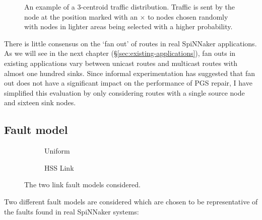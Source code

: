 			\begin{figure}
				\center
				
				\caption[An example of a 3-centroid traffic distribution.]%
				{An example of a 3-centroid traffic distribution. Traffic is
				sent by the node at the position marked with an {\color{red}$\times$}
				to nodes chosen randomly with nodes in lighter areas being selected
				with a higher probability.}
				\label{fig:traffic-distribution-centroids}
			\end{figure}
			
			There is little consensus on the `fan out' of routes in real SpiNNaker
			applications. As we will see in the next chapter
			(\S\ref{sec:existing-applications}), fan outs in existing applications
			vary between unicast routes and multicast routes with almost one hundred
			sinks. Since informal experimentation has suggested that fan out does not
			have a significant impact on the performance of PGS repair, I have
			simplified this evaluation by only considering routes with a single
			source node and sixteen sink nodes.
		
		\subsection{Fault model}
			
			\begin{figure}
				\center
				\begin{subfigure}{0.48\linewidth}
					\hspace*{-0.5cm}
					
					\caption{Uniform}
					\label{fig:fault-example-uniform}
				\end{subfigure}
				\begin{subfigure}{0.48\linewidth}
					\hspace*{-0.5cm}
					
					\caption{HSS Link}
					\label{fig:fault-example-hss}
				\end{subfigure}
				
				\caption{The two link fault models considered.}
				\label{fig:fault-example}
			\end{figure}
			
			Two different fault models are considered which are chosen to be
			representative of the faults found in real SpiNNaker systems:
			

